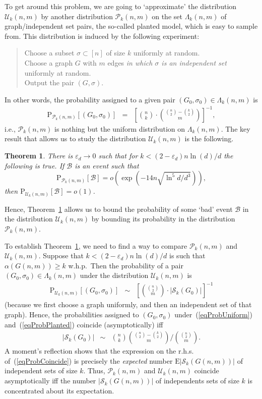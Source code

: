 \documentclass[a4paper,10pt]{article}
\newtheorem{theorem}{Theorem}\renewcommand{\thetheorem}{\arabic{theorem}}
\newcommand\cB{\mathcal{B}}
\newcommand\cU{\mathcal{U}}
\newcommand\cS{\mathcal{S}}
\newcommand\cP{\mathcal{P}}
\newcommand\eps{\varepsilon}
\newcommand\Erw{\mathrm{E}}
\newcommand\pr{\mathrm{P}}
\newcommand{\bink}[2] {{{#1}\choose {#2}}}
\newcommand\ra{\rightarrow}
\newcommand\bc[1]{\left({#1}\right)}
\newcommand\brk[1]{\left\lbrack{#1}\right\rbrack}
\newcommand{\whp}{w.h.p.}
\newcommand\Thm{Theorem}
\begin{document}
To get around this problem, we are going to `approximate' the
distribution $\cU_k(n,m)$ by another distribution $\cP_k(n,m)$
on the set $\Lambda_k(n,m)$ of graph/independent set pairs, the
so-called planted model, which is easy to sample from. This
distribution is induced by the following experiment:
\begin{quote}
Choose a subset $\sigma\subset\brk n$ of size $k$ uniformly at random.\\
Choose a graph $G$ with $m$ edges \emph{in which $\sigma$ is an
 independent set} uniformly at random.\\
Output the pair $(G, \sigma)$.
\end{quote}
In other words, the probability assigned to a given pair $(G_0,\sigma_0)\in\Lambda_k(n,m)$ is
	\begin{eqnarray}\label{eqProbPlanted}
	\pr_{\cP_k(n,m)}\brk{(G_0,\sigma_0)}&=&\brk{\bink{n}k\cdot\bink{\bink{n}2-\bink{k}2}m}^{-1},
	\end{eqnarray}
i.e., $\cP_k(n,m)$ is nothing but the uniform distribution on $\Lambda_k(n,m)$.
The key result that allows us to study the distribution $\cU_k(n,m)$ is the following.

\begin{theorem}\label{thrm:transfer-theorem}
There is $\eps_d\ra0$ such that  for $k<(2-\eps_d)n\ln(d)/d$ the following is true.
If $\cB$ is an event such that
	\begin{equation}\label{eqtransfer-theoremassumption}
	\pr_{\cP_k(n,m)}\brk\cB=o\bc{\exp\bc{-14 n\sqrt{{\ln^5d}/{d^3}}}},
	\end{equation}
then $\pr_{\cU_k(n,m)}\brk\cB=o(1)$.
\end{theorem}
Hence, \Thm~\ref{thrm:transfer-theorem} allows us to bound the 
probability of some `bad' event $\cB$ in the distribution $\cU_k(n,m)$
by bounding its probability in the distribution $\cP_k(n,m)$.

To establish \Thm~\ref{thrm:transfer-theorem}, we need to find
a way to compare $\cP_k(n,m)$ and $\cU_k(n,m)$. Suppose that
$k<(2-\eps_d)n\ln(d)/d$ is such that $\alpha(G(n,m))\geq k$ \whp\
Then the probability of a pair $(G_0,\sigma_0)\in\Lambda_k(n,m)$
under the distribution $\cU_k(n,m)$ is
\begin{eqnarray}\label{eqProbUniform}
	\pr_{\cU_k(n,m)}\brk{(G_0,\sigma_0)}&\sim&\brk{\bink{\bink{n}2}m\cdot|\cS_k(G_0)|}^{-1}
\end{eqnarray}
(because we first choose a graph uniformly, and then an independent
set of that graph). Hence, the probabilities assigned to $(G_0,\sigma_0)$
under~(\ref{eqProbUniform}) and~(\ref{eqProbPlanted}) coincide
(asymptotically) iff
\begin{eqnarray}\label{eqProbCoincide}
	|\cS_k(G_0)|&\sim&\bink{n}k\bink{\bink{n}2-\bink{k}2}m/\bink{\bink{n}2}m.
\end{eqnarray}
A moment's reflection shows that the expression on the r.h.s.
of~(\ref{eqProbCoincide}) is precisely the \emph{expected}
number $\Erw|\cS_k(G(n,m))|$ of independent sets of size $k$.
Thus, $\cP_k(n,m)$ and $\cU_k(n,m)$ coincide asymptotically iff
the number $|\cS_k(G(n,m))|$ of independents sets of size $k$ is
concentrated about its expectation.
\end{document}
